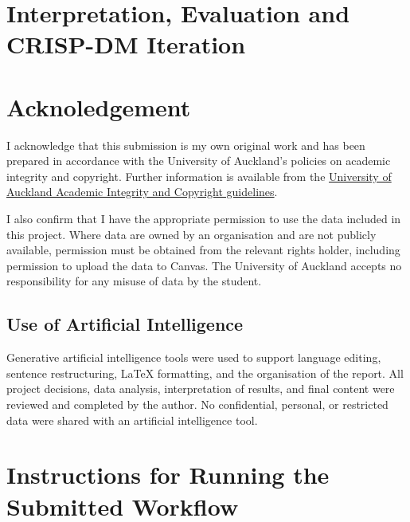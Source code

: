 \documentclass[a4paper]{article}
\begin{document}
\section{Interpretation, Evaluation and CRISP-DM Iteration}
\label{sec:multiple-iteration}


% 



\newpage
\section{Acknoledgement}
I acknowledge that this submission is my own original work and has been prepared in accordance with the University of Auckland's policies on academic integrity and copyright. Further information is available from the
\href{https://www.auckland.ac.nz/en/students/forms-policies-and-guidelines/student-policies-and-guidelines/academic-integrity-copyright.html}
{University of Auckland Academic Integrity and Copyright guidelines}.

I also confirm that I have the appropriate permission to use the data included in this project. Where data are owned by an organisation and are not publicly available, permission must be obtained from the relevant rights holder, including permission to upload the data to Canvas. The University of Auckland accepts no responsibility for any misuse of data by the student.

\subsection*{Use of Artificial Intelligence}
Generative artificial intelligence tools were used to support language editing, sentence restructuring, LaTeX formatting, and the organisation of the report. All project decisions, data analysis, interpretation of results, and final content were reviewed and completed by the author. No confidential, personal, or restricted data were shared with an artificial intelligence tool.

\newpage

\printbibliography[
    heading=bibintoc,
    title={References}
]

\clearpage
\appendix
\section{Instructions for Running the Submitted Workflow}
\label{app:running-workflow}

\end{document}
